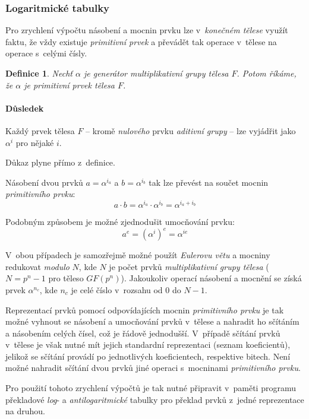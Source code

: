 \documentclass[thesis=M,czech,hidelinks]{FITthesis}[2012/06/26]
\newcommand{\0}{{\textcolor[gray]{0.80}{0}}}
\newtheorem{definice}{Definice}
\begin{document}
\subsubsection{Logaritmické tabulky}
Pro zrychlení výpočtu násobení a mocnin prvku lze v~\emph{konečném tělese}
využít faktu, že vždy existuje \emph{primitivní prvek} a převádět tak operace
v~tělese na operace s~celými čísly.

\begin{definice}
    Nechť $\alpha$ je \emph{generátor} \emph{multiplikativní grupy} tělesa $F$.
    Potom říkáme, že $\alpha$ je \emph{primitivní prvek} tělesa $F$.
\end{definice}

\paragraph{Důsledek} Každý prvek tělesa $F$ -- kromě \emph{nulového} prvku
\emph{aditivní grupy} -- lze vyjádřit jako $\alpha^i$ pro nějaké $i$.

Důkaz plyne přímo z~definice.

Násobení dvou prvků $a = \alpha^{i_a}$ a $b = \alpha^{i_b}$ tak lze převést na
součet mocnin \emph{primitivního prvku}:
$$ a \cdot b = \alpha^{i_a} \cdot \alpha^{i_b} = \alpha^{i_a + i_b} $$

Podobným způsobem je možné zjednodušit umocňování prvku:
$$ a^e = \left(\alpha^i\right)^e = \alpha^{i e} $$

V~obou případech je samozřejmě možné použít \emph{Eulerovu větu} a mocniny
redukovat \emph{modulo} $N$, kde $N$ je počet prvků \emph{multiplikativní grupy
tělesa} ($N=p^n-1$ pro těleso $GF(p^n)$). Jakoukoliv operací násobení a mocnění
se získá prvek $\alpha^{n_c}$, kde $n_c$ je celé číslo v~rozsahu od $0$ do
$N-1$.

Reprezentací prvků pomocí odpovídajících mocnin \emph{primitivního prvku} je tak
možné vyhnout se násobení a umocňování prvků v~tělese a nahradit ho sčítáním a
násobením celých čísel, což je řádově jednodušší. V~případě sčítání prvků
v~tělese je však nutné mít jejich standardní reprezentaci (seznam koeficientů),
jelikož se sčítání provádí po jednotlivých koeficientech, respektive bitech.
Není možné nahradit sčítání dvou prvků jiné operaci s~mocninami
\emph{primitivního prvku}.

Pro použití tohoto zrychlení výpočtů je tak nutné připravit v~paměti programu
překladové \emph{log}- a \emph{antilogaritmické} tabulky pro překlad prvků
z~jedné reprezentace na druhou.
\end{document}
